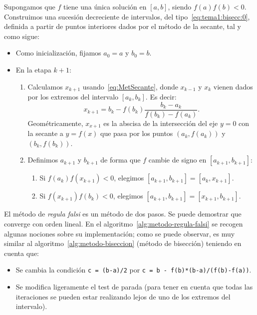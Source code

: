 Supongamos que $f$ tiene una única solución en
$[a,b]$, siendo $f(a)f(b)<0$.  Construimos una sucesión decreciente de
intervalos, del tipo~\eqref{eq:tema1:bisecc:0}, definida a partir de
puntos interiores dados por el método de la secante, tal y como sigue:
\begin{itemize}
\item Como inicialización, fijamos $a_0=a$ y $b_0=b$.
\item En la etapa $k+1$:
  \begin{enumerate}%
  \item 
    Calculamos $x_{k+1}$ usando~\eqref{eq:MetSecante}, donde $x_{k-1}$
    y $x_k$ vienen dados por los extremos del intervalo
    $[a_k,b_k]$. Es decir:
    \begin{equation*}
      x_{k+1} = b_k - f(b_k) \dfrac{b_k-a_k}{f(b_k)-f(a_k)}.
    \end{equation*}
    Geométricamente, $x_{x+1}$ es la abscisa de la
    intersección del eje $y=0$ con la secante a $y=f(x)$ que pasa por
    los puntos $(a_k,f(a_k))$ y $(b_k,f(b_k))$.
  \item Definimos $a_{k+1}$ y $b_{k+1}$ de forma que $f$ cambie de signo en
    $[a_{k+1},b_{k+1}]$:
    \begin{enumerate}
    \item Si $f(a_{k})f(x_{k+1})<0$, elegimos $[a_{k+1},b_{k+1}]=[a_{k}, x_{k+1}]$.
    \item Si $f(x_{k+1})f(b_{k})<0$, elegimos $[a_{k+1},b_{k+1}]=[x_{k+1}, b_{k+1}]$.
    \end{enumerate}
  \end{enumerate}
\end{itemize}

El método de \textit{regula falsi} es un método de dos pasos. Se puede
demostrar que converge con orden lineal. En el
algoritmo~\ref{alg:metodo-regula-falsi} se recogen algunas nociones
sobre su implementación; como se puede observar, es muy similar al
algoritmo~\ref{alg:metodo-biseccion} (método de bisección) teniendo en
cuenta que:
\begin{itemize}
\item Se cambia la condición \texttt{c = (b-a)/2} por \texttt{c = b -
    f(b)*(b-a)/(f(b)-f(a))}.
\item Se modifica ligeramente el test de parada (para tener en
  cuenta que todas las iteraciones se pueden estar realizando lejos de
  uno de los extremos del intervalo).
\end{itemize}


